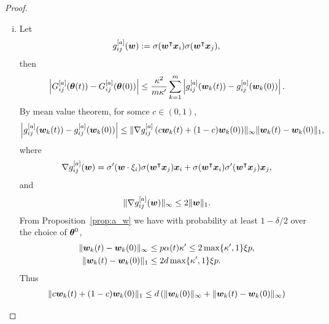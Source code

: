\documentclass[twoside,11pt]{article}
\begin{document}
\begin{proof}
\begin{enumerate}[(a)]
\begin{enumerate}[(i)]
                  \item Let
                        \begin{equation*}
                            g^{[a]}_{ij}(\bm{w}) := \sigma(\bm{w}^\intercal\bm{x}_i)\sigma(\bm{w}^\intercal\bm{x}_j),
                        \end{equation*}
                        then
                        \begin{equation*}
                            \left\lvert G_{ij}^{[a]}(\bm{\theta}(t)) - G_{ij}^{[a]}(\bm{\theta}(0))\right\rvert \leq \frac{\kappa^2}{m\kappa'}\sum_{k=1}^m \left\lvert g^{[a]}_{ij}(\bm{w}_k(t)) - g^{[a]}_{ij}(\bm{w}_k(0))\right\rvert.
                        \end{equation*}
                        By mean value theorem, for somce $c\in(0,1)$,
                        \begin{equation*}
                            \left\lvert g^{[a]}_{ij}(\bm{w}_k(t)) - g^{[a]}_{ij}(\bm{w}_k(0))\right\rvert \leq \lVert\nabla g^{[a]}_{ij}\left(c\bm{w}_k(t) + (1-c)\bm{w}_k(0)\right)\rVert_{\infty}\lVert\bm{w}_k(t) - \bm{w}_k(0)\rVert_1,
                        \end{equation*}
                        where
                        \begin{equation*}
                            \nabla g_{ij}^{[a]}(\bm{w})=\sigma'(\bm{w}\cdot\xi_i)\sigma(\bm{w}^\intercal\bm{x}_j)\bm{x}_i+\sigma(\bm{w}^\intercal\bm{x}_i)\sigma'(\bm{w}^\intercal\bm{x}_j)\bm{x}_j,
                        \end{equation*}
                        and
                        \begin{equation*}
                            \lVert\nabla g_{ij}^{[a]}(\bm{w})\rVert_{\infty}\leq 2\lVert\bm{w}\rVert_1.
                        \end{equation*}
                        From Proposition~\ref{prop:a_w} we have with probability at least $1-\delta/2$ over the choice of $\bm{\theta}^0$,
                        \begin{align*}
                            \lVert\bm{w}_k(t)-\bm{w}_k(0)\rVert_{\infty} & \leq p\alpha(t)\kappa'\leq 2\max\{\kappa',1\}\xi p, \\
                            \lVert\bm{w}_k(t)-\bm{w}_k(0)\rVert_1        & \leq 2d\max\{\kappa',1\}\xi p.
                        \end{align*}
                        Thus
                        \begin{equation*}
                            \begin{aligned}
                                \norm{c\vw_k(t) + (1-c)\vw_k(0)}_1
                                 & \leq d\left(\norm{\vw_k(0)}_{\infty} + \norm{\vw_k(t) - \vw_k(0)}_{\infty}\right) \\

\end{aligned}
\end{equation*}
\end{enumerate}
\end{enumerate}
\end{proof}
\end{document}
